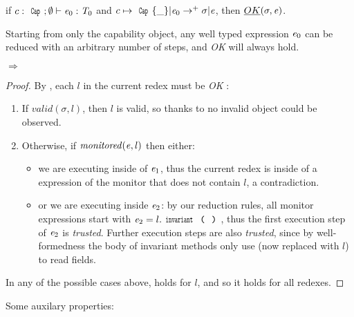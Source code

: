 \begin{theorem}\rm
if $c:\Kw{Cap};\emptyset\vdash \e_0: \T_0$ and
$c\mapsto\Kw{Cap}\{\_\}|\e_0\rightarrow^+ \sigma|\e$, then
$\emph{OK}(\sigma,{\mathit{e}})$.
\end{theorem}
\noindent Starting from only the capability object,
any well typed expression ${\mathit{e}}_0$ can be reduced with an arbitrary number of steps,
and \emph{OK} will always hold.

\begin{theorem}\rm {} $\Rightarrow$ 
\end{theorem}
\begin{proof}
\noindent By , each $l$ in the current redex must be \emph{OK} :
\begin{enumerate}
	\item If $\mathit{valid}(\sigma,l)$, then $l$ is valid, so thanks to 
	no invalid object could be observed.
	\item Otherwise, if $\mathit{monitored}({\mathit{e}},l)$ then either:
	\begin{itemize}
	 \item we are executing inside of ${\mathit{e}}_1$, thus the current redex is inside of a expression of the monitor that does not contain $l$, a contradiction.
	 \item or we are executing inside ${\mathit{e}}_2$:
	 by our reduction rules, all monitor expressions start with
	 $\e_2=l.\invariant$, thus the first execution step
	 of ${\mathit{e}}_2$ is \emph{trusted}. Further execution steps are also \emph{trusted}, since by well-formedness the body of invariant methods only use \Q@this@ (now replaced with $l$) to read fields.
	\end{itemize}
\end{enumerate}
In any of the possible cases above,  holds for $l$, and so it holds for all redexes.
\end{proof}

Some auxilary properties:\\

